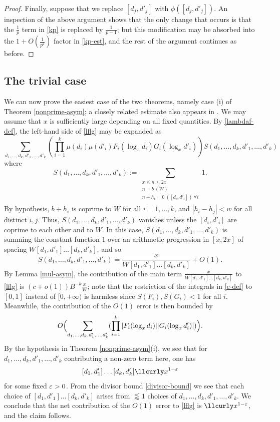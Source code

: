 \begin{proof}
Finally, suppose that we replace $[d_j,d'_j]$ with $\phi([d_j,d'_j])$.  An inspection of the above argument shows that the only change that occurs is that the $\frac{1}{p}$ term in \eqref{kp} is replaced by $\frac{1}{p-1}$; but this modification may be absorbed into the $1+O(\frac{1}{p^2})$ factor in \eqref{kp-est}, and the rest of the argument continues as before.
\end{proof}

\subsection{The trivial case}\label{triv-sec}

We can now prove the easiest case of the two theorems, namely case (i) of Theorem \ref{nonprime-asym}; a closely related estimate also appears in \cite[Lemma 6.2]{maynard-new}.  We may assume that $x$ is sufficiently large depending on all fixed quantities. By \eqref{lambdaf-def}, the left-hand side of \eqref{lflg} may be expanded as
\begin{equation}\label{lflg-expand}
 \sum_{d_1,\dots,d_k,d'_1,\dots,d'_k} \left(\prod_{i=1}^k \mu(d_i) \mu(d'_i) F_i(\log_x d_i) G_i(\log_x d'_i)\right) S(d_1,\dots,d_k,d'_1,\dots,d'_k)
\end{equation}
where
$$ S(d_1,\dots,d_k,d'_1,\dots,d'_k) := 
 \sum_{\substack{x \leq n \leq 2x\\ n = b\ (W) \\ n + h_i = 0\ ([d_i,d'_i])\ \forall i\\}} 1.
$$
By hypothesis, $b+h_i$ is coprime to $W$ for all $i=1,\dots,k$, and $|h_i-h_j| < w$ for all distinct $i,j$.  Thus, $S(d_1,\dots,d_k,d'_1,\dots,d'_k)$ vanishes unless the $[d_i,d'_i]$ are coprime to each other and to $W$.  In this case, $S(d_1,\dots,d_k,d'_1,\dots,d'_k)$ is summing the constant function $1$ over an arithmetic progression in $[x,2x]$ of spacing $W [d_1,d'_1] \dots [d_k,d'_k]$, and so  
$$ S(d_1,\dots,d_k,d'_1,\dots,d'_k) = \frac{x}{W [d_1,d'_1] \dots [d_k,d'_k]} + O(1).$$
By Lemma \ref{mul-asym}, the contribution of the main term
$\frac{x}{W [d_1,d'_1] \dots [d_k,d'_k]}$ to \eqref{lflg} is $(c+o(1)) B^{-k} \frac{x}{W}$; note that the restriction of the integrals in \eqref{c-def} to $[0,1]$ instead of $[0,+\infty)$ is harmless since $S(F_i), S(G_i) < 1$ for all $i$.  Meanwhile, the contribution of the $O(1)$ error is then bounded by
$$
O\Bigl( \sum_{d_1,\dots,d_k,d'_1,\dots,d'_k} (\prod_{i=1}^k |F_i(\log_x d_i)| |G_i(\log_x d'_i)|)\Bigr).$$
By the hypothesis in Theorem \ref{nonprime-asym}(i), we see that for $d_1,\dots,d_k,d'_1,\dots,d'_k$ contributing a non-zero term here, one has
$$
[d_1,d'_1] \dots [d_k,d'_k] \lessapprox x^{1-\eps}$$
for some fixed $\varepsilon>0$. From the divisor bound \eqref{divisor-bound} we see that each choice of $[d_1,d'_1] \dots [d_k,d'_k]$ arises from $\lessapprox 1$ choices of $d_1,\dots,d_k,d'_1,\dots,d'_k$.  We conclude that the net contribution of the $O(1)$ error to \eqref{lflg} is $\lessapprox x^{1-\eps}$, and the claim follows.

